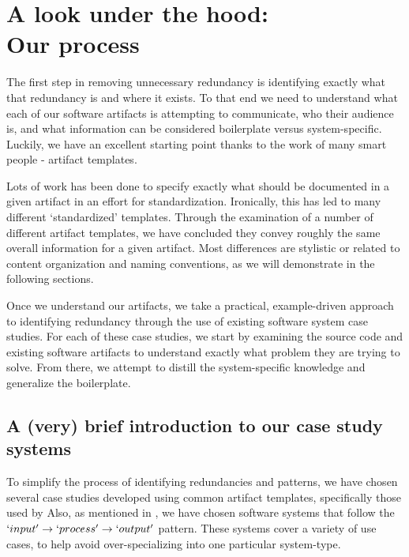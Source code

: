 \chapter{A look under the hood: \\ Our process}


The first step in removing unnecessary redundancy is identifying exactly what
that redundancy is and where it exists. To that end we need to understand what
each of our software artifacts is attempting to communicate, who their audience
is, and what information can be considered boilerplate versus system-specific.
Luckily, we have an excellent starting point thanks to the work of many smart
people - artifact templates.

Lots of work  has been done to specify 
exactly what should be documented in a given artifact in an effort for 
standardization. Ironically, this has led to many different `standardized' 
templates. Through the examination of a number of different artifact templates, 
we have concluded they convey roughly the same overall information for a given 
artifact. Most differences are stylistic or related to content 
organization and naming conventions, as we will demonstrate in the following 
sections.

Once we understand our artifacts, we take a practical, example-driven approach
to identifying redundancy through the use of existing software system case
studies. For each of these case studies, we start by examining the source code
and existing software artifacts to understand exactly what problem they are
trying to solve. From there, we attempt to distill the system-specific knowledge
and generalize the boilerplate.

\section{A (very) brief introduction to our case study systems}

To simplify the process of identifying redundancies and patterns, we have chosen
several case studies developed using common artifact templates, specifically 
those used by \smithea{}  Also, as mentioned in 
\ds{[SCOPE]}, we have chosen software systems that follow the $`input' 
\rightarrow `process' \rightarrow `output'$ pattern. These systems cover a 
variety of use cases, to help avoid over-specializing into one particular 
system-type. 

